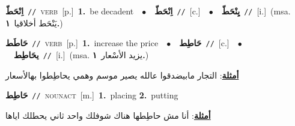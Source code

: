 \documentclass[10pt,a4paper,twoside]{article} %
\begin{document}
\begin{multicols}{2}
{\setlength\topsep{0pt}\textbf{\foreignlanguage{arabic}{اِنْحَطّ}}\ {\color{gray}\texttt{//}\color{black}}\ \textsc{verb}\ [p.]\ \textbf{1.}~be decadent\ \ $\bullet$\ \ \setlength\topsep{0pt}\textbf{\foreignlanguage{arabic}{اِنْحَطّ}}\ {\color{gray}\texttt{//}\color{black}}\ [c.]\ \ $\bullet$\ \ \setlength\topsep{0pt}\textbf{\foreignlanguage{arabic}{يِنْحَطّ}}\ {\color{gray}\texttt{//}\color{black}}\ [i.]\ \color{gray}(msa. \foreignlanguage{arabic}{يَنْحَط أخلاقيا}~\foreignlanguage{arabic}{\textbf{١.}})\color{black}\ } \vspace{2mm}

{\setlength\topsep{0pt}\textbf{\foreignlanguage{arabic}{حَاطَط}}\ {\color{gray}\texttt{//}\color{black}}\ \textsc{verb}\ [p.]\ \textbf{1.}~increase the price\ \ $\bullet$\ \ \setlength\topsep{0pt}\textbf{\foreignlanguage{arabic}{حَاطِط}}\ {\color{gray}\texttt{//}\color{black}}\ [c.]\ \ $\bullet$\ \ \setlength\topsep{0pt}\textbf{\foreignlanguage{arabic}{يحَاطِط}}\ {\color{gray}\texttt{//}\color{black}}\ [i.]\ \color{gray}(msa. \foreignlanguage{arabic}{يزيد الأسْعار}~\foreignlanguage{arabic}{\textbf{١.}})\color{black}\  \begin{flushright}\color{gray}\foreignlanguage{arabic}{\textbf{\underline{\foreignlanguage{arabic}{أمثلة}}}: التجار مابيضدقوا عالله يصير موسم وهمي يحاطِطوا بهالأسعار}\end{flushright}\color{black}} \vspace{2mm}

{\setlength\topsep{0pt}\textbf{\foreignlanguage{arabic}{حَاطِط}}\ {\color{gray}\texttt{//}\color{black}}\ \textsc{noun\textunderscore act}\ [m.]\ \textbf{1.}~placing  \textbf{2.}~putting\  \begin{flushright}\color{gray}\foreignlanguage{arabic}{\textbf{\underline{\foreignlanguage{arabic}{أمثلة}}}: أنا مش حاطِطها هناك شوفلك واحد ثاني يحطلك اياها}\end{flushright}\color{black}} \vspace{2mm}


\end{multicols}
\end{document}
